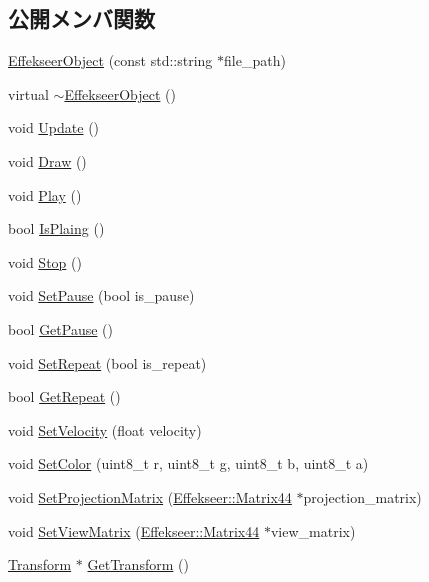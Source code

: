\subsection*{公開メンバ関数}
\begin{DoxyCompactItemize}
\item 
\mbox{\hyperlink{class_effekseer_object_a8e1e081f62efa87b31e00bcfd9cf1a45}{Effekseer\+Object}} (const std\+::string $\ast$file\+\_\+path)
\item 
virtual \mbox{\hyperlink{class_effekseer_object_a0463ba508e3c83576991138465847054}{$\sim$\+Effekseer\+Object}} ()
\item 
void \mbox{\hyperlink{class_effekseer_object_aecb9314a5ff922c9420301129d2f26f7}{Update}} ()
\item 
void \mbox{\hyperlink{class_effekseer_object_adc628e5089ca0cdc418e92729943a3b2}{Draw}} ()
\item 
void \mbox{\hyperlink{class_effekseer_object_a59c8a12b4eb558449622660d892b3cf4}{Play}} ()
\item 
bool \mbox{\hyperlink{class_effekseer_object_a6fe253dd3387bdfd9305878ff194f305}{Is\+Plaing}} ()
\item 
void \mbox{\hyperlink{class_effekseer_object_adfbdfbe202b78441b33d76656453e536}{Stop}} ()
\item 
void \mbox{\hyperlink{class_effekseer_object_aeec933c68ceb4bafc69d65590c470d72}{Set\+Pause}} (bool is\+\_\+pause)
\item 
bool \mbox{\hyperlink{class_effekseer_object_a482a0e824d8719b7676ae15948ae7348}{Get\+Pause}} ()
\item 
void \mbox{\hyperlink{class_effekseer_object_a77122f2d71d44d6cceec2b6bdedb4b2a}{Set\+Repeat}} (bool is\+\_\+repeat)
\item 
bool \mbox{\hyperlink{class_effekseer_object_a3c44b29c016fb5b3618e2d39060844be}{Get\+Repeat}} ()
\item 
void \mbox{\hyperlink{class_effekseer_object_a3c14fd4215640b648b14e445b99564f7}{Set\+Velocity}} (float velocity)
\item 
void \mbox{\hyperlink{class_effekseer_object_a5c496e56785ef7b784b13642d59d4e7f}{Set\+Color}} (uint8\+\_\+t r, uint8\+\_\+t g, uint8\+\_\+t b, uint8\+\_\+t a)
\item 
void \mbox{\hyperlink{class_effekseer_object_aa3849f176ccb493b162d08c1ef387996}{Set\+Projection\+Matrix}} (\mbox{\hyperlink{struct_effekseer_1_1_matrix44}{Effekseer\+::\+Matrix44}} $\ast$projection\+\_\+matrix)
\item 
void \mbox{\hyperlink{class_effekseer_object_ac7f3145b79b5e65e45014abd30ee5de8}{Set\+View\+Matrix}} (\mbox{\hyperlink{struct_effekseer_1_1_matrix44}{Effekseer\+::\+Matrix44}} $\ast$view\+\_\+matrix)
\item 
\mbox{\hyperlink{class_transform}{Transform}} $\ast$ \mbox{\hyperlink{class_effekseer_object_ad7e825d08856df48459437ad759d7a00}{Get\+Transform}} ()
\end{DoxyCompactItemize}
